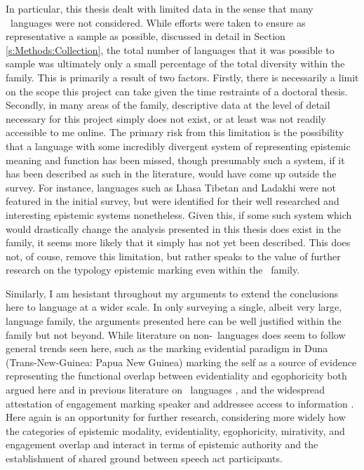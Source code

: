 In particular, this thesis dealt with limited data in the sense that many \lfam\ languages were not considered. While efforts were taken to ensure as representative a sample as possible, discussed in detail in Section \ref{s:Methods:Collection}, the total number of languages that it was possible to sample was ultimately only a small percentage of the total diversity within the family. This is primarily a result of two factors. Firstly, there is necessarily a limit on the scope this project can take given the time restraints of a doctoral thesis. Secondly, in many areas of the family, descriptive data at the level of detail necessary for this project simply does not exist, or at least was not readily accessible to me online. The primary risk from this limitation is the possibility that a language with some incredibly divergent system of representing epistemic meaning and function has been missed, though presumably such a system, if it has been described as such in the literature, would have come up outside the survey. For instance, languages such as Lhasa Tibetan and Ladakhi were not featured in the initial survey, but were identified for their well researched and interesting epistemic systems nonetheless. Given this, if some such system which would drastically change the analysis presented in this thesis does exist in the family, it seems more likely that it simply has not yet been described. This does not, of couse, remove this limitation, but rather speaks to the value of further research on the typology epistemic marking even within the \lfam\ family.

Similarly, I am hesistant throughout my arguments to extend the conclusions here to language at a wider scale. In only surveying a single, albeit very large, language family, the arguments presented here can be well justified within the family but not beyond. While literature on non-\lfam\ languages does seem to follow general trends seen here, such as the marking evidential paradigm in Duna (Trans-New-Guinea: Papua New Guinea) marking the self as a source of evidence \cite{SanRoque2012} representing the functional overlap between evidentiality and egophoricity both argued here and in previous literature on \lfam\ languages \cites{Gawne2017}{Hill2020}, and the widespread attestation of engagement marking speaker and addressee access to information \cite{EvansBergqvistSanRoque2018a}. Here again is an opportunity for further research, considering more widely how the categories of epistemic modality, evidentiality, egophoricity, mirativity, and engagement overlap and interact in terms of epistemic authority and the establishment of shared ground between speech act participants.

